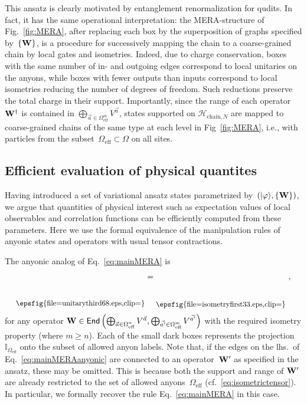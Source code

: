 \documentclass[floats,prb,twocolumn]{revtex4}
\newcommand*{\cH}{\mathcal{H}}
\newcommand*{\End}{\mathsf{End}}
\newcommand{\id}{\mathbb{I}}
\def\id{\mathbb{I}}
\newcommand{\ket}[1]{|#1\rangle}
\newcommand*{\Xisometry}{{\bf W}}
\newcommand*{\isometryfirst}{\raisebox{-37.443pt}{\epsfig{file=isometryfirst33.eps,clip=}}}
\newcommand*{\unitarythird}{\raisebox{-36.003pt}{\epsfig{file=unitarythird68.eps,clip=}}}
\begin{document}
This ansatz is clearly motivated by entanglement renormalization for qudits. In fact, it has the same  operational interpretation: the MERA-structure of Fig.~\ref{fig:MERA}, after replacing each box by the superposition of graphs specified by~$\{\Xisometry\}$, is a procedure for successively mapping the chain to a coarse-grained chain by local gates and isometries. Indeed, due to charge conservation, boxes with the same number of in- and outgoing edges correspond to local unitaries on the anyons, while boxes with fewer outputs than inputs correspond to local isometries reducing the number of degrees of freedom. Such  reductions  preserve the total charge in their support. Importantly, since the range of each operator~$\Xisometry^\dagger$  is contained in $\bigoplus_{\vec{a}\in\Omega^m_{\textrm{eff}}} V^{\vec{a}}$, states supported on $\cH_{\textrm{chain},N}$ are mapped to coarse-grained chains of the same type at each level in Fig~\ref{fig:MERA}, i.e., with particles from the subset~$\Omega_{\textrm{eff}}\subset\Omega$ on all sites.



\subsection{Efficient evaluation of physical quantites}
Having introduced a set of variational ansatz states parametrized by~$(\ket{\varphi},\{\Xisometry\})$, we argue that quantities of physical interest such as expectation values of local observables and correlation functions can be efficiently computed from these parameters. Here we use the formal equivalence of the manipulation rules of anyonic states and operators with usual tensor contractions. 

The anyonic analog of Eq.~\eqref{eq:mainMERA} is 
\begin{align} 
\scalebox{0.9}{\unitarythird} =\scalebox{0.9}{\isometryfirst}\ ,\label{eq:mainMERAanyonic} 
\end{align} 
for any operator $\Xisometry\in\End\left(\bigoplus_{\vec{a}\in\Omega_{\textrm{eff}}^n}V^{\vec{a}},\bigoplus_{\vec{a'}\in\Omega_{\textrm{eff}}^m} V^{\vec{a'}}\right)$ with the required isometry property (where $m\geq n$). Each of the small dark boxes represents the projection~$\id_{\Omega_{\textrm{eff}}}$ onto the subset of  allowed anyon labels. Note that, if the edges on the lhs.~of Eq.~\eqref{eq:mainMERAanyonic} are connected to an operator~$\Xisometry'$ as specified in the ansatz, these  may be omitted. This is because both the support and range of $\Xisometry'$ are already restricted to  the set of allowed anyons~$\Omega_{\textrm{eff}}$ (cf.~\eqref{eq:isometrictensor}). In particular, we formally recover the rule Eq.~\eqref{eq:mainMERA} in this case.
\end{document}
